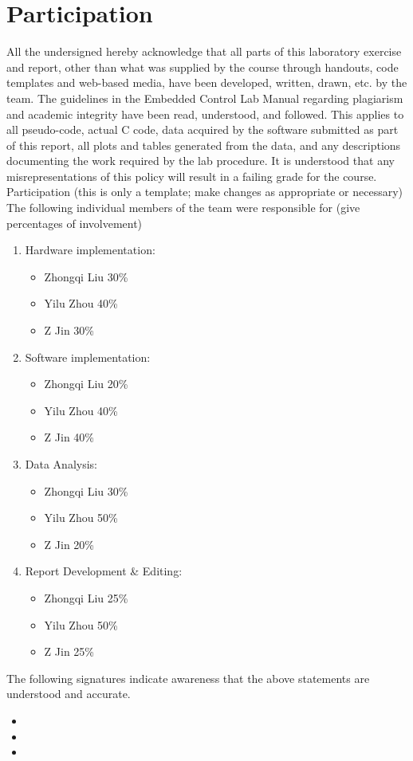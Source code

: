 \documentclass[12pt]{article}
\begin{document}
\section{Participation}
All the undersigned hereby acknowledge that all parts of this laboratory exercise and report, other than what was supplied by the course through handouts, code templates and web-based media, have been developed, written, drawn, etc. by the team. The guidelines in the Embedded Control Lab Manual regarding plagiarism and academic integrity have been read, understood, and followed. This applies to all pseudo-code, actual C code, data acquired by the software submitted as part of this report, all plots and tables generated from the data, and any descriptions documenting the work required by the lab procedure. It is understood that any misrepresentations of this policy will result in a failing grade for the course. Participation (this is only a template; make changes as appropriate or necessary) The following individual members of the team were responsible for (give percentages of involvement)
\begin{enumerate}
  \item Hardware implementation:
  \begin{itemize}
    \item Zhongqi Liu \hfill 30\%
    \item Yilu Zhou \hfill 40\%
    \item Z Jin \hfill 30\%
  \end{itemize}
  \item Software implementation:
  \begin{itemize}
    \item Zhongqi Liu \hfill 20\%
    \item Yilu Zhou \hfill 40\%
    \item Z Jin \hfill 40\%
  \end{itemize}
  \item Data Analysis:
  \begin{itemize}
    \item Zhongqi Liu \hfill 30\%
    \item Yilu Zhou \hfill 50\%
    \item Z Jin \hfill 20\%
  \end{itemize}
  \item Report Development \& Editing:
  \begin{itemize}
    \item Zhongqi Liu \hfill 25\%
    \item Yilu Zhou \hfill 50\%
    \item Z Jin \hfill 25\%
  \end{itemize}
\end{enumerate}
The following signatures indicate awareness that the above statements are understood and accurate.
\begin{itemize}
  \item
  \item
  \item
\end{itemize}
\end{document}
